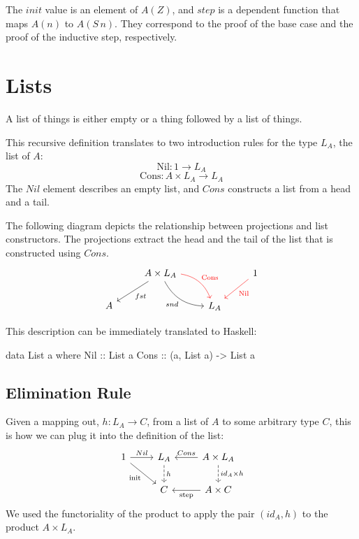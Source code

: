 \documentclass[DaoFP]{subfiles}
\begin{document}
The $init$ value is an element of $A(Z)$, and $step$ is a dependent function that maps $A(n)$ to $A(S\, n)$. They correspond to the proof of the base case and the proof of the inductive step, respectively.

\section{Lists}

A list of things is either empty or a thing followed by a list of things. 

This recursive definition translates to two introduction rules for the type $L_A$, the list of $A$: 
\[ \text{Nil} \colon 1 \to L_A \]
\[ \text{Cons} \colon A \times L_A \to L_A \]
The $Nil$ element describes an empty list, and $Cons$ constructs a list from a head and a tail. 

The following diagram depicts the relationship between projections and list constructors. The projections extract the head and the tail of the list that is constructed using $Cons$.
\[
 \begin{tikzcd}
 & A \times L_A
 \arrow[ld, "fst"]
 \arrow[rd, bend right, "snd"']
 \arrow[rd, bend left, red, "\text{Cons}"]
 && 1
 \arrow[ld, red, "\text{Nil}"]
 \\
 A
&&L_A
  \end{tikzcd}
\]

This description can be immediately translated to Haskell:
\begin{haskell}
data List a where
  Nil  :: List a
  Cons :: (a, List a) -> List a
\end{haskell}



\subsection{Elimination Rule}

Given a mapping out, $h \colon L_A \to C$, from a list of $A$ to some arbitrary type $C$, this is how we can plug it into the definition of the list:
\[
 \begin{tikzcd}
 1
 \arrow[r, "Nil"]
 \arrow[rd, "\text{init}"']
 &L_A
\arrow[d, dashed, "h"]
&A \times L_A
  \arrow[l, "Cons"']
\arrow[d, dashed, "id_A \times h"]
\\
& C
& A \times C
\arrow[l, "\text{step}"]
  \end{tikzcd}
\]
We used the functoriality of the product to apply the pair $(id_A, h)$ to the product $A \times L_A$.
\end{document}
